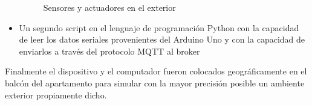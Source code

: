 \begin{itemize}
\begin{figure}[!htb]
\caption{Sensores y actuadores en el exterior}
\label{fig:sensores_ext}
\vspace*{-10pt}
\end{figure}

\item Un segundo script en el lenguaje de programación Python con la capacidad de leer los datos seriales provenientes del Arduino Uno y con la capacidad de enviarlos a través del protocolo MQTT al broker %

\end{itemize}
Finalmente el dispositivo y el computador fueron colocados geográficamente en el balcón del apartamento para simular con la mayor precisión posible un ambiente exterior propiamente dicho.\\

